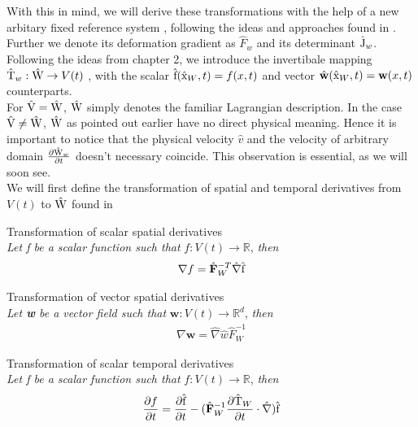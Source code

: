 With this in mind, we will derive these transformations with the help of a new arbitary fixed reference system , following the ideas and approaches found in \cite{Richter2016}. Further we denote its deformation gradient as $\hat{F}_w$ and its determinant $\text{\^{J}}_w$. Following the ideas from chapter 2, we introduce the invertibale mapping $\text{\^{T}}_w : \text{\^{W}} \rightarrow V(t)$ , with the scalar $\text{\^{f}}(\text{\^{x}}_W, t) = f(x,t) $ and vector $\hat{w}(\ha{x}_W, t) = \mathbf{w}(x,t) $ counterparts.\\ 
For $\text{\^{V}} = \text{\^{W}}$, $\text{\^{W}}$ simply denotes the familiar Lagrangian description.
In the case $\text{\^{V}} \neq \text{\^{W}}$, $\text{\^{W}}$ as pointed out earlier have no direct physical meaning.  Hence it is important to notice that the physical velocity $\hat{v}$ and the velocity of arbitrary domain $\frac{\partial \text{\^{W}}_w}{\partial t}$ doesn't necessary coincide. This observation is essential, as we will soon see. \\

We will first define the transformation of spatial and temporal derivatives from $V(t)$ to $\text{\^{W}}$ found in \cite{Richter2016}\\

\begin{lem}
Transformation of scalar spatial derivatives \\
\textit{Let f be a scalar function such that} $f: V(t) \rightarrow \mathbb{R}$, \textit{then} 
\begin{align}
\nabla f = \hat{F}_W^{-T} \hat{\nabla}\ha{f}
\end{align} 
\end{lem}

\begin{lem}
Transformation of vector spatial derivatives \\
\textit{Let \textbf{w} be a vector field such that} $\mathbf{w}: V(t) \rightarrow \mathbb{R}^d$, \textit{then} 
\begin{align}
\nabla \mathbf{w} = \hat{\nabla}\hat{w} \hat{F}_W^{-1} 
\end{align} 
\end{lem}

\begin{lem}
Transformation of scalar temporal derivatives \\
\textit{Let f be a scalar function such that} $f: V(t) \rightarrow \mathbb{R}$, \textit{then} 
\begin{align}
\pder{f}{t} = \pder{\ha{f} }{t} - (\hat{F}_W^{-1} \pder{\ha{T}_W}{t} \cdot \hat{\nabla}) \ha{f}
\end{align} 
\end{lem}

